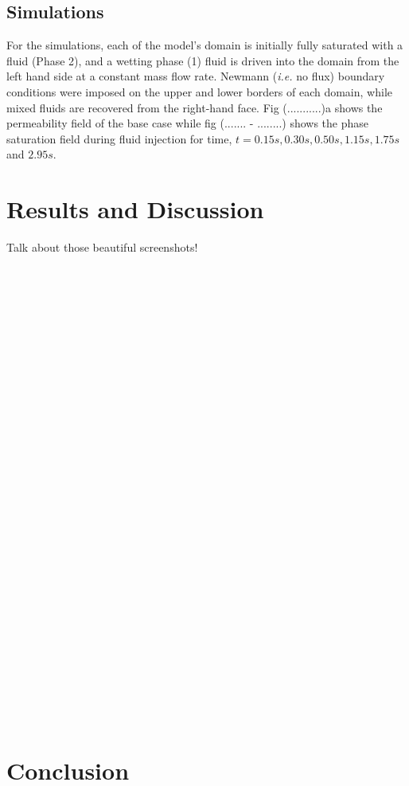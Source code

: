 \documentclass[preprint,12pt]{elsarticle}
\begin{document}
\subsection{Simulations}\label{subsection:simulations}
For the simulations, each of the model's domain is initially fully saturated with a fluid (Phase 2), and a wetting phase (1) fluid is driven into the domain from the left hand side at a constant mass flow rate. Newmann ({\it i.e.} no flux) boundary conditions were imposed on the upper and lower borders of each domain, while mixed fluids are recovered from the right-hand face. Fig (...........)a shows the permeability field of the base case while fig (....... - ........) shows the phase saturation field during fluid injection for time, $t = 0.15s, 0.30s, 0.50s, 1.15s, 1.75s$ and $2.95s$.

\section{Results and Discussion}\label{section:results_discussion}

Talk about those beautiful screenshots!\\
\\
\\
\\
\\
\\
\\
\\
\\
\\
\\
\\
\\
\\
\\
\\
\\
\\
\\
\\
\\
\\
\\
\\
\\
\\
\\
\\
\\
\\
\\

\section{Conclusion}\label{section:conclusion}
\end{document}
